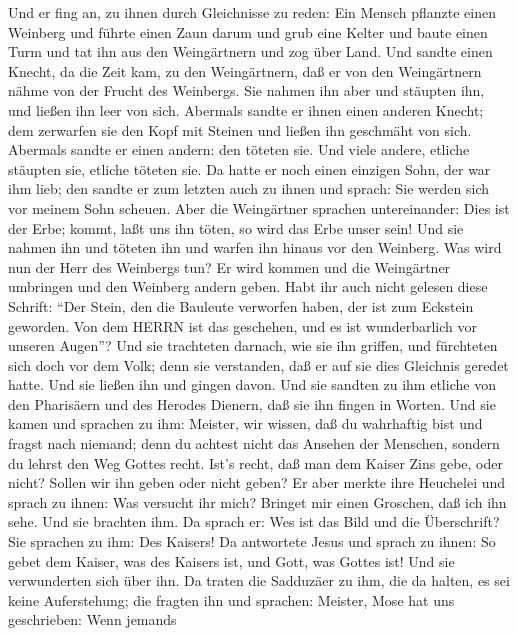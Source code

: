  Und er fing an, zu ihnen durch Gleichnisse zu reden: Ein
Mensch pflanzte einen Weinberg und führte einen Zaun darum und grub eine
Kelter und baute einen Turm und tat ihn aus den Weingärtnern und zog
über Land.  Und sandte einen Knecht, da die Zeit kam, zu den
Weingärtnern, daß er von den Weingärtnern nähme von der Frucht des
Weinbergs.  Sie nahmen ihn aber und stäupten ihn, und ließen
ihn leer von sich.  Abermals sandte er ihnen einen anderen
Knecht; dem zerwarfen sie den Kopf mit Steinen und ließen ihn geschmäht
von sich.  Abermals sandte er einen andern: den töteten sie.
Und viele andere, etliche stäupten sie, etliche töteten sie.
 Da hatte er noch einen einzigen Sohn, der war ihm lieb; den
sandte er zum letzten auch zu ihnen und sprach: Sie werden sich vor
meinem Sohn scheuen.  Aber die Weingärtner sprachen
untereinander: Dies ist der Erbe; kommt, laßt uns ihn töten, so wird das
Erbe unser sein!  Und sie nahmen ihn und töteten ihn und
warfen ihn hinaus vor den Weinberg.  Was wird nun der Herr
des Weinbergs tun? Er wird kommen und die Weingärtner umbringen und den
Weinberg andern geben.  Habt ihr auch nicht gelesen diese
Schrift: ``Der Stein, den die Bauleute verworfen haben, der ist zum
Eckstein geworden.  Von dem HERRN ist das geschehen, und es
ist wunderbarlich vor unseren Augen''?  Und sie trachteten
darnach, wie sie ihn griffen, und fürchteten sich doch vor dem Volk;
denn sie verstanden, daß er auf sie dies Gleichnis geredet hatte. Und
sie ließen ihn und gingen davon.  Und sie sandten zu ihm
etliche von den Pharisäern und des Herodes Dienern, daß sie ihn fingen
in Worten.  Und sie kamen und sprachen zu ihm: Meister, wir
wissen, daß du wahrhaftig bist und fragst nach niemand; denn du achtest
nicht das Ansehen der Menschen, sondern du lehrst den Weg Gottes recht.
Ist's recht, daß man dem Kaiser Zins gebe, oder nicht? Sollen wir ihn
geben oder nicht geben?  Er aber merkte ihre Heuchelei und
sprach zu ihnen: Was versucht ihr mich? Bringet mir einen Groschen, daß
ich ihn sehe.  Und sie brachten ihm. Da sprach er: Wes ist
das Bild und die Überschrift? Sie sprachen zu ihm: Des Kaisers!
 Da antwortete Jesus und sprach zu ihnen: So gebet dem
Kaiser, was des Kaisers ist, und Gott, was Gottes ist! Und sie
verwunderten sich über ihn.  Da traten die Sadduzäer zu
ihm, die da halten, es sei keine Auferstehung; die fragten ihn und
sprachen:  Meister, Mose hat uns geschrieben: Wenn jemands
